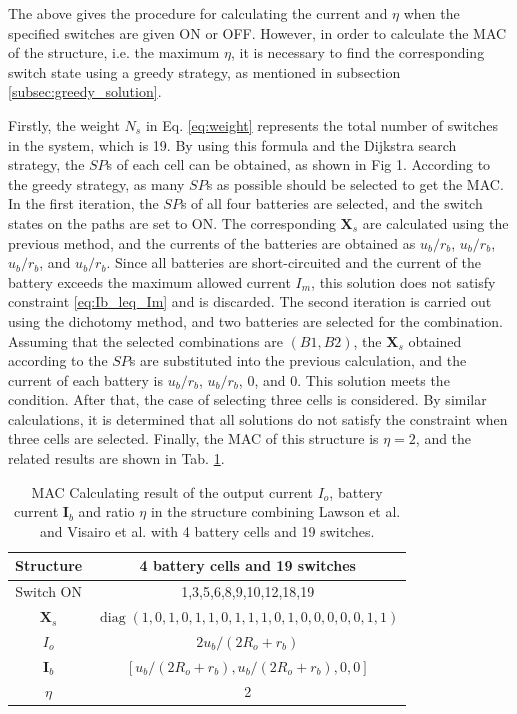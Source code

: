 \documentclass{article}
\DeclareMathOperator{\diag}{diag}
\begin{document}
The above gives the procedure for calculating the current and $\eta$ when the specified switches are given ON or OFF.
However, in order to calculate the MAC of the structure, i.e. the maximum $\eta$, it is necessary to find the corresponding switch state using a greedy strategy, as mentioned in subsection \ref{subsec:greedy_solution}.

Firstly, the weight $N_s$ in Eq. \ref{eq:weight} represents the total number of switches in the system, which is 19. 
By using this formula and the Dijkstra search strategy, the $SP$s of each cell can be obtained, as shown in Fig 1.  %
According to the greedy strategy, as many $SP$s as possible should be selected to get the MAC. 
In the first iteration, the $SP$s of all four batteries are selected, and the switch states on the paths are set to ON. 
The corresponding $\bm{X}_s$ are calculated using the previous method, and the currents of the batteries are obtained as $u_b/r_b$, $u_b/r_b$, $u_b/r_b$, and $u_b/r_b$. 
Since all batteries are short-circuited and the current of the battery exceeds the maximum allowed current $I_m$, this solution does not satisfy constraint \ref{eq:Ib_leq_Im} and is discarded. 
The second iteration is carried out using the dichotomy method, and two batteries are selected for the combination. 
Assuming that the selected combinations are $(B1, B2)$, the $\bm{X}_s$ obtained according to the $SP$s are substituted into the previous calculation, and the current of each battery is $u_b/r_b$, $u_b/r_b$, $0$, and $0$. 
This solution meets the condition. 
After that, the case of selecting three cells is considered. 
By similar calculations, it is determined that all solutions do not satisfy the constraint when three cells are selected. 
Finally, the MAC of this structure is $\eta=2$, and the related results are shown in Tab. \ref{tab:find_mac}.

\begin{table}[htbp]
  \centering
    \caption{MAC Calculating result of the output current $I_o$, battery current $\bm{I}_b$ and ratio $\eta$ in the structure combining Lawson et al.\cite{lawsonSoftwareConfigurableBattery2012} and Visairo et al.\cite{visairoReconfigurableBatteryPack2008} with 4 battery cells and 19 switches.}
    \begin{tabular}{cc}
    \toprule
        Structure & 4 battery cells and 19 switches  \\
    \midrule
    Switch ON & 1,3,5,6,8,9,10,12,18,19 \\
    $\bm{X}_s$ & $\diag(1,0,1,0,1,1,0,1,1,1,0,1,0,0,0,0,0,1,1)$ \\
    \midrule
        $I_o$ & $2u_b/(2R_o+r_b)$ \\
        $\bm{I}_b$ & $[u_b/(2R_o+r_b),u_b/(2R_o+r_b),0,0]$ \\
        $\eta$     & 2 \\
    \bottomrule
    \end{tabular}%
  \label{tab:find_mac}%
\end{table}%
\end{document}
